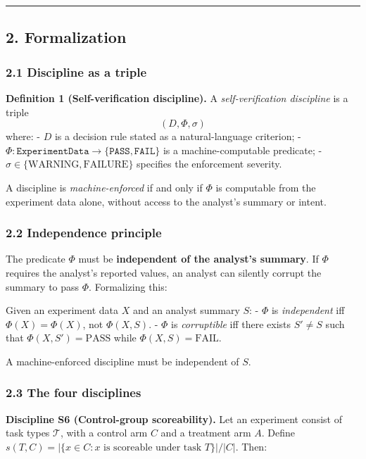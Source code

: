 \documentclass[
]{article}
\begin{document}
\begin{center}\rule{0.5\linewidth}{0.5pt}\end{center}

\subsection{2. Formalization}\label{formalization}

\subsubsection{2.1 Discipline as a triple}\label{discipline-as-a-triple}

\textbf{Definition 1 (Self-verification discipline).} A
\emph{self-verification discipline} is a triple \[(D, \Phi, \sigma)\]
where: - \(D\) is a decision rule stated as a natural-language
criterion; -
\(\Phi: \texttt{ExperimentData} \to \{\texttt{PASS}, \texttt{FAIL}\}\)
is a machine-computable predicate; -
\(\sigma \in \{\text{WARNING}, \text{FAILURE}\}\) specifies the
enforcement severity.

A discipline is \emph{machine-enforced} if and only if \(\Phi\) is
computable from the experiment data alone, without access to the
analyst's summary or intent.

\subsubsection{2.2 Independence principle}\label{independence-principle}

The predicate \(\Phi\) must be \textbf{independent of the analyst's
summary}. If \(\Phi\) requires the analyst's reported values, an analyst
can silently corrupt the summary to pass \(\Phi\). Formalizing this:

Given an experiment data \(X\) and an analyst summary \(S\): - \(\Phi\)
is \emph{independent} iff \(\Phi(X) = \Phi(X)\), not \(\Phi(X, S)\). -
\(\Phi\) is \emph{corruptible} iff there exists \(S' \neq S\) such that
\(\Phi(X, S') = \text{PASS}\) while \(\Phi(X, S) = \text{FAIL}\).

A machine-enforced discipline must be independent of \(S\).

\subsubsection{2.3 The four disciplines}\label{the-four-disciplines}

\textbf{Discipline S6 (Control-group scoreability).} Let an experiment
consist of task types \(\mathcal{T}\), with a control arm \(C\) and a
treatment arm \(A\). Define
\(s(T, C) = |\{x \in C : x \text{ is scoreable under task } T\}| / |C|\).
Then:
\end{document}
